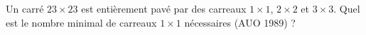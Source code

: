 Un carré $23 \times 23$ est entièrement pavé par des carreaux $1 \times 1$, $2 \times 2$ et $3 \times 3$. Quel est le nombre minimal de carreaux $1 \times 1$ nécessaires (AUO 1989) ?
